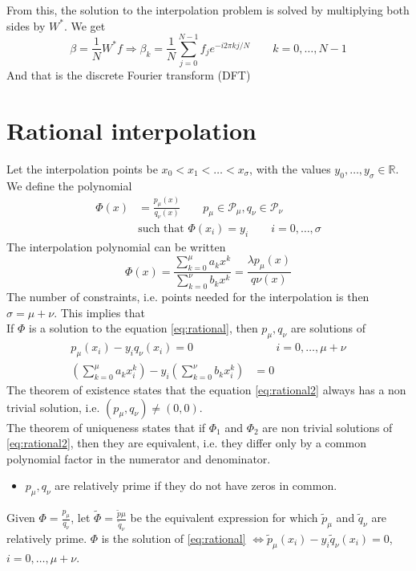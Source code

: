 \documentclass[12pt, openany]{report}
\theoremstyle{definition}
\newcommand{\R}{\mathbb{R}}
\begin{document}
From this, the solution to the interpolation problem is solved by multiplying both sides by \(W^*\). We get 
\begin{equation}
    \beta = \frac{1}{N}W^*f \Longrightarrow \beta_k = \frac{1}{N}\sum_{j=0}^{N-1}f_j e^{-i2\pi kj/N} \qquad k=0,\dots,N-1
\end{equation}
And that is the discrete Fourier transform (DFT)
\section{Rational interpolation}
Let the interpolation points be \(x_0< x_1<\dots<x_\sigma\), with the values \(y_0,\dots,y_\sigma\in\R\). We define the polynomial
\begin{align}\label{eq:rational}
    \Phi(x) &= \frac{p_\mu(x)}{q_\nu(x)} \qquad p_\mu \in\mathcal{P}_\mu, q_\nu\in \mathcal{P}_\nu\\
    &\text{such that } \Phi(x_i)=y_i\qquad i = 0,\dots,\sigma
\end{align}
The interpolation polynomial can be written 
\begin{equation}
    \Phi(x) = \frac{\sum_{k=0}^\mu a_kx^k}{\sum_{k=0}^\nu b_kx^k} = \frac{\lambda p_\mu(x)}{q\nu(x)}
\end{equation}
The number of constraints, i.e. points needed for the interpolation is then \(\sigma=\mu +\nu\). This implies that\\
If \(\Phi\) is a solution to the equation \eqref{eq:rational}, then \(p_\mu,q_\nu\) are solutions of 
\begin{align}\label{eq:rational2}
    p_\mu(x_i) - y_i q_\nu(x_i) = 0&\qquad i = 0,\dots,\mu + \nu\\
    \left(\sum_{k=0}^\mu a_kx_i^k\right) - y_i\left(\sum_{k=0}^\nu b_kx_i^k\right) &= 0
\end{align}
The theorem of existence states that the equation \eqref{eq:rational2} always has a non trivial solution, i.e. \((p_\mu,q_\nu) \neq (0,0)\). \\
The theorem of uniqueness states that if \(\Phi_1\) and \(\Phi_2\) are non trivial solutions of \eqref{eq:rational2}, then they are equivalent, i.e. they differ only by a common polynomial factor in the numerator and denominator.\\

\begin{itemize}
    \item \(p_\mu,q_\nu\) are relatively prime if they do not have zeros in common.
\end{itemize}
Given \(\Phi = \frac{p_\mu}{q_\nu}\), let \(\tilde{\Phi}=\frac{\tilde{p}\mu}{\tilde{q}_\nu}\) be the equivalent expression for which \(\tilde{p}_\mu\) and \(\tilde{q}_\nu\) are relatively prime. \(\Phi\) is the solution of \eqref{eq:rational} \(\Longleftrightarrow \tilde{p}_\mu(x_i)-y_i \tilde{q}_\nu(x_i)=  0\), \(i=0,\dots,\mu+\nu\).  
\end{document}
